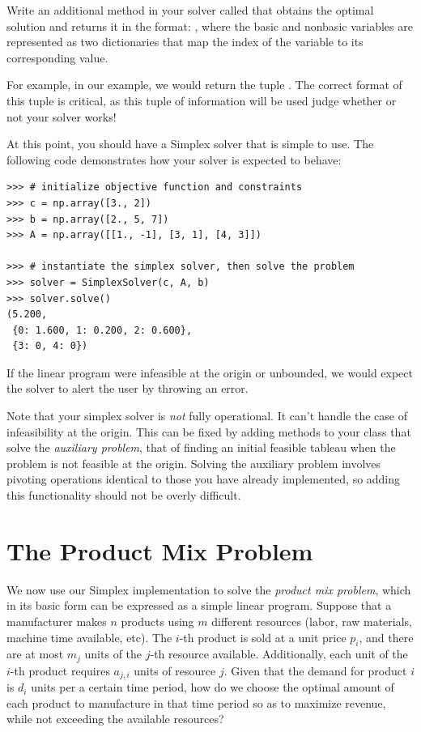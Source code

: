 \begin{problem}
Write an additional method in your solver called  that obtains the optimal solution and returns it in the format: , where the basic and nonbasic variables are represented as two dictionaries that map the index of the variable to
its corresponding value.

For example, in our example, we would return the tuple .
The correct format of this tuple is critical, as this tuple of information will be used judge whether or not your solver works!
\end{problem}

At this point, you should have a Simplex solver that is simple to use. The following code demonstrates how your solver is
expected to behave:

\begin{lstlisting}
>>> # initialize objective function and constraints
>>> c = np.array([3., 2])
>>> b = np.array([2., 5, 7])
>>> A = np.array([[1., -1], [3, 1], [4, 3]])

>>> # instantiate the simplex solver, then solve the problem
>>> solver = SimplexSolver(c, A, b)
>>> solver.solve()
(5.200,
 {0: 1.600, 1: 0.200, 2: 0.600},
 {3: 0, 4: 0})
\end{lstlisting}

If the linear program were infeasible at the origin or unbounded, we would expect the solver to alert the user by throwing an error.

Note that your simplex solver is \emph{not} fully operational. It can't handle the case of infeasibility at the origin. This can be fixed by adding
methods to your class that solve the \emph{auxiliary problem}, that of finding an initial feasible tableau when the problem is not feasible at the
origin. Solving the auxiliary problem involves pivoting operations identical to those you have already implemented, so adding this functionality
should not be overly difficult.

\section*{The Product Mix Problem}
We now use our Simplex implementation to solve the \emph{product mix problem}, which in its basic form can be expressed as a simple linear program.
Suppose that a manufacturer makes $n$ products using $m$ different resources (labor, raw materials, machine time available, etc).
The $i$-th product is sold at a unit price $p_i$, and there are at most $m_j$ units
of the $j$-th resource available. Additionally, each unit of the $i$-th product requires $a_{j,i}$ units of resource $j$.
Given that the demand for product $i$ is $d_i$ units per a certain time period, how do we choose the optimal amount
of each product to manufacture in that time period so as to maximize revenue, while not exceeding the available resources?

